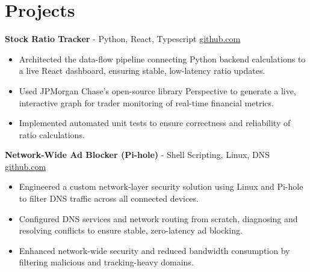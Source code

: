 \documentclass[11pt]{article}       %
\begin{document}

\vspace{-18.5pt}

\section*{Projects}

\textbf{Stock Ratio Tracker}{ - Python, React, Typescript} \hfill \href{https://github.com/Monica20030707/tradingDashboard-UI}{github.com} \\
\vspace{-9pt}
\begin{itemize}
  \item Architected the data-flow pipeline connecting Python backend calculations to a live React dashboard, ensuring stable, low-latency ratio updates. 
  \item Used JPMorgan Chase’s open-source library Perspective to generate a live, interactive graph for trader monitoring of real-time financial metrics.
  \item Implemented automated unit tests to ensure correctness and reliability of ratio calculations.
\end{itemize}

\textbf{Network-Wide Ad Blocker (Pi-hole)}{ - Shell Scripting, Linux, DNS} \hfill \href{https://github.com/Monica20030707}{github.com} \\
\vspace{-9pt}
\begin{itemize}
  \item Engineered a custom network-layer security solution using Linux and Pi-hole to filter DNS traffic across all connected devices.
  \item Configured DNS services and network routing from scratch, diagnosing and resolving conflicts to ensure stable, zero-latency ad blocking.
  \item Enhanced network-wide security and reduced bandwidth consumption by filtering malicious and tracking-heavy domains.
\end{itemize}
\end{document}

